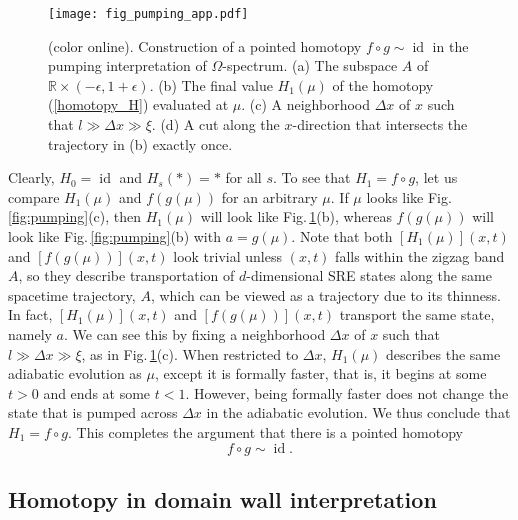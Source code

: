 \documentclass[sort&compress]{elsarticle}
\theoremstyle{theoremstyle}
\theoremstyle{framedtheoremstyle}
\theoremstyle{definitionstyle}
\theoremstyle{definitionstyle}
\theoremstyle{definitionstyle}
\theoremstyle{definitionstyle}
\theoremstyle{nameddefinitionstyle}
\theoremstyle{framednameddefinitionstyle}
\theoremstyle{proofstyle}
\theoremstyle{definitionstyle}
\newcommand{\RRR}{\mathbb{R}}
\DeclareMathOperator{\identity}{id}
\newcommand{\paren}[1]{\left( #1 \right)}
\newcommand{\brackets}[1]{\left[ #1 \right]}
\begin{document}
\begin{appendices}
\begin{figure}
\centering
\texttt{[image: fig\_pumping\_app.pdf]}
\caption{(color online). Construction of a pointed homotopy $f \circ g \sim \identity$ in the pumping interpretation of $\Omega$-spectrum. (a) The subspace $A$ of $\RRR \times (-\epsilon, 1+\epsilon)$. (b) The final value $H_1(\mu)$ of the homotopy (\ref{homotopy_H}) evaluated at $\mu$. (c) A neighborhood $\Delta x$ of $x$ such that $l \gg \Delta x \gg \xi$. (d) A cut along the $x$-direction that intersects the trajectory in (b) exactly once.}
\label{fig:pumping_app}
\end{figure}


Clearly, $H_0 = \identity$ and $H_s(\ast) = \ast$ for all $s$. To see that $H_1 = f \circ g$, let us compare $H_1(\mu)$ and $f\paren{g\paren{\mu}}$ for an arbitrary $\mu$. If $\mu$ looks like Fig.\,\ref{fig:pumping}(c), then $H_1(\mu)$ will look like Fig.\,\ref{fig:pumping_app}(b), whereas $f\paren{g\paren{\mu}}$ will look like Fig.\,\ref{fig:pumping}(b) with $a = g(\mu)$. Note that both $\brackets{H_1(\mu)}(x,t)$ and $\brackets{f\paren{g\paren{\mu}}}(x,t)$ look trivial unless $(x,t)$ falls within the zigzag band $A$, so they describe transportation of $d$-dimensional SRE states along the same spacetime trajectory, $A$, which can be viewed as a trajectory due to its thinness. In fact, $\brackets{H_1(\mu)}(x,t)$ and $\brackets{f\paren{g\paren{\mu}}}(x,t)$ transport the same state, namely $a$. We can see this by fixing a neighborhood $\Delta x$ of $x$ such that $l \gg \Delta x \gg \xi$, as in Fig.\,\ref{fig:pumping_app}(c).
When restricted to $\Delta x$, $H_1(\mu)$ describes the same adiabatic evolution as $\mu$, except it is formally faster, that is, it begins at some $t > 0$ and ends at some $t<1$. However, being formally faster does not change the state that is pumped across $\Delta x$ in the adiabatic evolution. We thus conclude that $H_1 = f \circ g$. This completes the argument that there is a pointed homotopy
\begin{equation}
f \circ g \sim \identity.
\end{equation}



\subsection{Homotopy in domain wall interpretation\label{subapp:homotopy_equivalence_domain_wall}}


\end{appendices}
\end{document}
